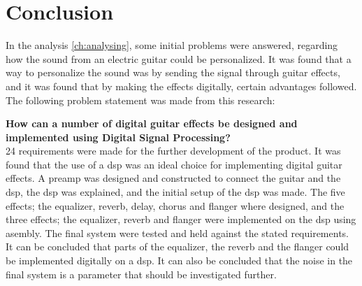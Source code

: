 \section{Conclusion}\label{sec:conclusion}

In the analysis \autoref{ch:analysing}, some initial problems were answered, regarding how the sound from an electric guitar could be personalized. It was found that a way to personalize the sound was by sending the signal through guitar effects, and it was found that by making the effects digitally, certain advantages followed. The following problem statement was made from this research:

\textbf{How can a number of digital guitar effects be designed and implemented using Digital Signal Processing?} \\

24 requirements were made for the further development of the product. 
It was found that the use of a \gls{dsp} was an ideal choice for implementing digital guitar effects. A \gls{preamp} was designed and constructed to connect the guitar and the \gls{dsp}, the \gls{dsp} was explained, and the initial setup of the \gls{dsp} was made. The five effects; the equalizer, \gls{reverb}, delay, chorus and flanger where designed, and the three effects; the equalizer, \gls{reverb} and flanger were implemented on the \gls{dsp} using asembly.
The final system were tested and held against the stated requirements. \\

It can be concluded that parts of the equalizer, the \gls{reverb} and the flanger could be implemented digitally on a \gls{dsp}. It can also be concluded that the noise in the final system is a parameter that should be investigated further.  


